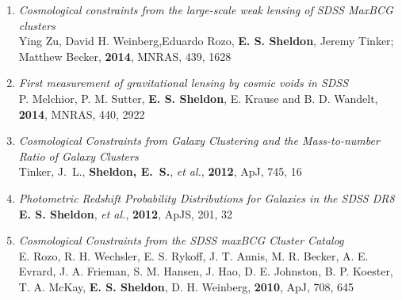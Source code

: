 \documentclass[10pt]{article}
\begin{document}
\begin{enumerate}

    \item \textit{Cosmological constraints from the large-scale weak lensing of SDSS MaxBCG clusters}\\
        Ying Zu, David H. Weinberg,Eduardo Rozo, {\bf E. S. Sheldon}, Jeremy Tinker; Matthew Becker,
        {\bf 2014}, MNRAS, 439, 1628

    \item \textit{First measurement of gravitational lensing by cosmic voids in SDSS}\\
        P. Melchior, P. M. Sutter, {\bf E. S. Sheldon}, E. Krause and B. D. Wandelt,
        {\bf 2014}, MNRAS, 440, 2922

    \item \textit{Cosmological Constraints from Galaxy Clustering and the Mass-to-number Ratio of Galaxy Clusters}\\
        Tinker, J.~L., {\bf Sheldon, E.~S.}, {\em et al.}, {\bf 2012}, ApJ, 745, 16

    \item \textit{Photometric Redshift Probability Distributions for Galaxies in the SDSS DR8}\\
        {\bf E. S. Sheldon}, {\em et al.}, {\bf 2012}, ApJS, 201, 32

    \item \textit{Cosmological Constraints from the SDSS maxBCG Cluster Catalog}\\
        E. Rozo, R. H. Wechsler, E. S. Rykoff, J. T. Annis, 
        M. R. Becker, A. E. Evrard, J. A. Frieman, S. M. Hansen, 
        J. Hao, D. E. Johnston, B. P. Koester, T. A. McKay, 
        {\bf E. S. Sheldon}, D. H. Weinberg, {\bf 2010}, ApJ, 708, 645


\end{enumerate}

\end{document}
